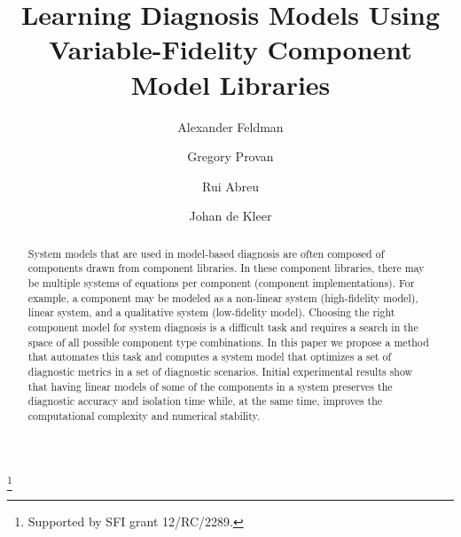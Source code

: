 \documentclass{ifacconf}
\begin{document}
%
\begin{frontmatter}
%
\title{Learning Diagnosis Models Using Variable-Fidelity Component Model Libraries}
%
\thanks[footnoteinfo]{Supported by SFI grant 12/RC/2289.}
%
\author[First]{Alexander Feldman}
\author[Second]{Gregory Provan}
\author[First]{Rui Abreu}
\author[First]{Johan de Kleer}
%
\address[First]{PARC Inc., Palo Alto, CA 94304, USA\\(e-mail: \{afeldman,dekleer,rui\}@parc.com)}
\address[Second]{Department of Computer Science, University College Cork, Cork, Ireland (e-mail: g.provan@cs.ucc.ie).}
%
\begin{abstract}
%
System models that are used in model-based diagnosis are often
composed of components drawn from component libraries. In these component
libraries, there may be multiple systems of equations per component
(component implementations). For example, a component may be modeled
as a non-linear system (high-fidelity model), linear system, and a
qualitative system (low-fidelity model). Choosing the right component
model for system diagnosis is a difficult task and requires a search
in the space of all possible component type combinations. In this
paper we propose a method that automates this task and computes a
system model that optimizes a set of diagnostic metrics in a set of
diagnostic scenarios. Initial experimental results show that having
linear models of some of the components in a system preserves the
diagnostic accuracy and isolation time while, at the same time,
improves the computational complexity and numerical stability.
%
\end{abstract}
\end{frontmatter}
%







%

%
\end{document}
